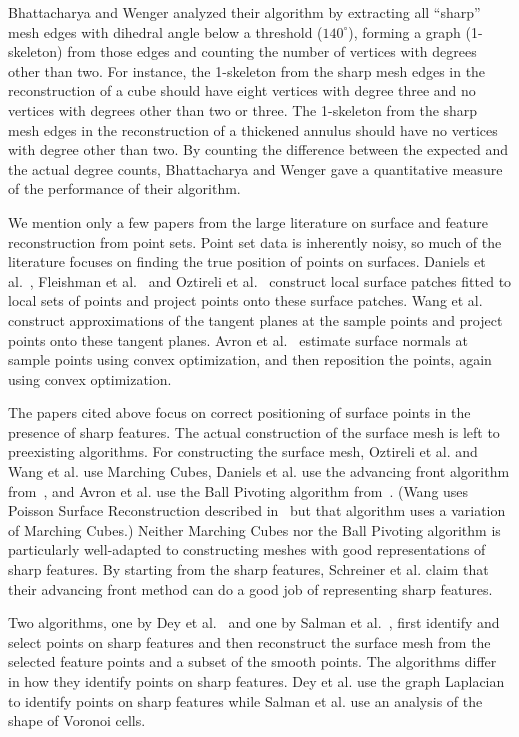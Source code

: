 Bhattacharya and Wenger analyzed their algorithm by extracting all 
``sharp'' mesh edges with dihedral angle below a threshold ($140^\circ$),
forming a graph (1-skeleton) from those edges
and counting the number of vertices with degrees other than two.
For instance, the 1-skeleton from the sharp mesh edges in the reconstruction
of a cube should have eight vertices with degree three
and no vertices with degrees other than two or three.
The 1-skeleton from the sharp mesh edges in the reconstruction
of a thickened annulus should have no vertices with degree other than two.
By counting the difference between the expected and the actual degree counts,
Bhattacharya and Wenger gave a quantitative measure of the performance
of their algorithm.

We mention only a few papers from the large literature
on surface and feature reconstruction from point sets.
Point set data is inherently noisy, so much of the literature
focuses on finding the true position of points on surfaces.
Daniels et al.~\cite{Daniels:2007:Robust},
Fleishman et al.~\cite{fcs-rmlsf-2005}
and Oztireli et al.~\cite{Oztireli2009}
construct local surface patches fitted to local sets of points
and project points onto these surface patches.
Wang et al.~\cite{Wang:2013:Feature}
construct approximations of the tangent planes at the sample points
and project points onto these tangent planes.
Avron et al.~\cite{avron2010L} estimate surface normals
at sample points using convex optimization,
and then reposition the points, again using convex optimization.

The papers cited above focus on correct positioning of surface points
in the presence of sharp features.
The actual construction of the surface mesh is
left to preexisting algorithms.
For constructing the surface mesh,
Oztireli et al. and Wang et al. use Marching Cubes,
Daniels et al. use the advancing front algorithm 
from~\cite{Schreiner:2006:Direct},
and Avron et al. use the Ball Pivoting algorithm 
from~\cite{Bernardini:1999:Ball}.
(Wang uses Poisson Surface Reconstruction described 
in~\cite{Kazhdan:2006:Poisson} but that algorithm
uses a variation of Marching Cubes.)
Neither Marching Cubes nor the Ball Pivoting algorithm
is particularly well-adapted to constructing meshes 
with good representations of sharp features.
By starting from the sharp features,
Schreiner et al. claim that their advancing front method
can do a good job of representing sharp features.

Two algorithms, one by Dey et al.~\cite{Dey2012} and 
one by Salman et al.~\cite{sym-fpmg-10},
first identify and select points on sharp features
and then reconstruct the surface mesh from the selected feature points
and a subset of the smooth points.
The algorithms differ in how they identify points on sharp features.
Dey et al. use the graph Laplacian to identify points on sharp features
while Salman et al. use an analysis of the shape of Voronoi cells.

